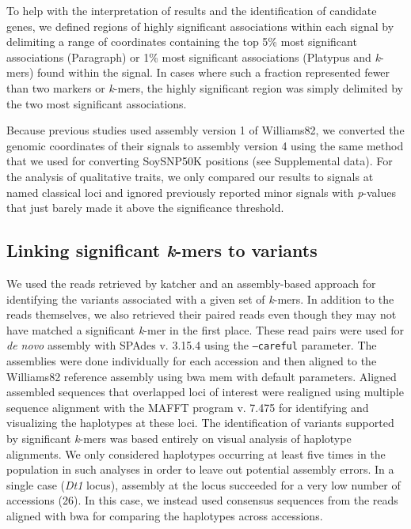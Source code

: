 To help with the interpretation of results and the identification of candidate
genes, we defined regions of highly significant associations within each signal
by delimiting a range of coordinates containing the top 5\% most significant
associations (Paragraph) or 1\% most significant associations (Platypus
and \emph{k}-mers) found within the signal. In cases where such a fraction
represented fewer than two markers or \emph{k}-mers, the highly significant
region was simply delimited by the two most significant associations.

Because previous studies \citep{bandillo2015, bandillo2017} used assembly version 1 of
Williams82, we converted the genomic coordinates of their signals to assembly version 4
using the same method that we used for converting
SoySNP50K positions (see Supplemental data). For the analysis of
qualitative traits, we only compared our results to signals at named classical
loci and ignored previously reported minor signals with \emph{p}-values that
just barely made it above the significance threshold.

\subsection*{Linking significant \emph{k}-mers to variants}
\label{sv-gwas-methods-linking-kmers}

We used the reads retrieved by katcher and an assembly-based approach for
identifying the variants associated with a given set of \emph{k}-mers. In
addition to the reads themselves, we also retrieved their paired reads even
though they may not have matched a significant \emph{k}-mer in the first place.
These read pairs were used for \emph{de novo} assembly with SPAdes v. 3.15.4
\citep{spades} using the \texttt{--careful} parameter. The assemblies were done
individually for each accession and then aligned to the Williams82 reference
assembly using bwa mem with default parameters.  Aligned assembled sequences
that overlapped loci of interest were realigned using multiple sequence
alignment with the MAFFT program v. 7.475 \citep{katoh2002} for identifying and
visualizing the haplotypes at these loci. The identification of variants
supported by significant \textit{k}-mers was based entirely on visual analysis
of haplotype alignments. We only considered haplotypes occurring at least five
times in the population in such analyses in order to leave out potential
assembly errors. In a single case (\emph{Dt1} locus), assembly at the locus
succeeded for a very low number of accessions (26). In this case, we instead used
consensus sequences from the reads aligned with bwa for comparing the
haplotypes across accessions. 

